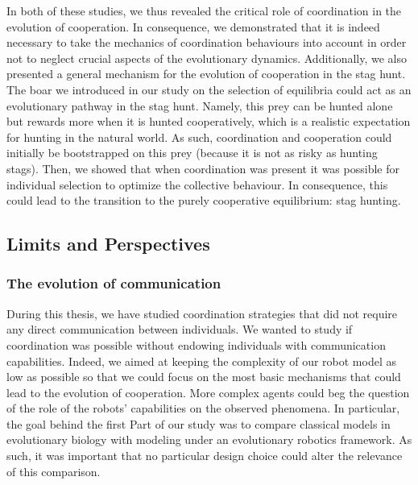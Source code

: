 		In both of these studies, we thus revealed the critical role of coordination in the evolution of cooperation. In consequence, we demonstrated that it is indeed necessary to take the mechanics of coordination behaviours into account in order not to neglect crucial aspects of the evolutionary dynamics. Additionally, we also presented a general mechanism for the evolution of cooperation in the stag hunt. The boar we introduced in our study on the selection of equilibria could act as an evolutionary pathway in the stag hunt. Namely, this prey can be hunted alone but rewards more when it is hunted cooperatively, which is a realistic expectation for hunting in the natural world. As such, coordination and cooperation could initially be bootstrapped on this prey (because it is not as risky as hunting stags). Then, we showed that when coordination was present it was possible for individual selection to optimize the collective behaviour. In consequence, this could lead to the transition to the purely cooperative equilibrium: stag hunting.


	\subsection{Limits and Perspectives}

		\subsubsection{The evolution of communication}

			During this thesis, we have studied coordination strategies that did not require any direct communication between individuals. We wanted to study if coordination was possible without endowing individuals with communication capabilities. Indeed, we aimed at keeping the complexity of our robot model as low as possible so that we could focus on the most basic mechanisms that could lead to the evolution of cooperation. More complex agents could beg the question of the role of the robots' capabilities on the observed phenomena. In particular, the goal behind the first Part of our study was to compare classical models in evolutionary biology with modeling under an evolutionary robotics framework. As such, it was important that no particular design choice could alter the relevance of this comparison.

